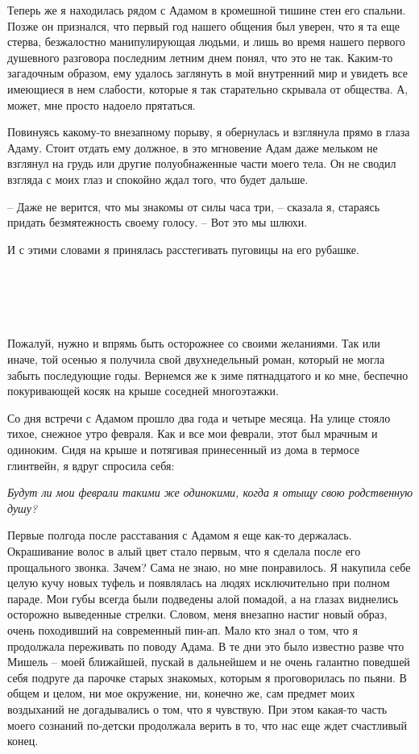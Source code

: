 \documentclass[
]{book}
\begin{document}
Теперь же я находилась рядом с Адамом в кромешной тишине стен его спальни. Позже он признался, что первый год нашего общения был уверен, что я та еще стерва, безжалостно манипулирующая людьми, и лишь во время нашего первого душевного разговора последним летним днем понял, что это не так. Каким-то загадочным образом, ему удалось заглянуть в мой внутренний мир и увидеть все имеющиеся в нем слабости, которые я так старательно скрывала от общества. А, может, мне просто надоело прятаться.

Повинуясь какому-то внезапному порыву, я обернулась и взглянула прямо в глаза Адаму. Стоит отдать ему должное, в это мгновение Адам даже мельком не взглянул на грудь или другие полуобнаженные части моего тела. Он не сводил взгляда с моих глаз и спокойно ждал того, что будет дальше.

-- Даже не верится, что мы знакомы от силы часа три, -- сказала я, стараясь придать безмятежность своему голосу. -- Вот это мы шлюхи.

И с этими словами я принялась расстегивать пуговицы на его рубашке.

\hypertarget{chapter-26}{%
\chapter{~}\label{chapter-26}}

Пожалуй, нужно и впрямь быть осторожнее со своими желаниями. Так или иначе, той осенью я получила свой двухнедельный роман, который не могла забыть последующие годы. Вернемся же к зиме пятнадцатого и ко мне, беспечно покуривающей косяк на крыше соседней многоэтажки.

Со дня встречи с Адамом прошло два года и четыре месяца. На улице стояло тихое, снежное утро февраля. Как и все мои феврали, этот был мрачным и одиноким. Сидя на крыше и потягивая принесенный из дома в термосе глинтвейн, я вдруг спросила себя:

\emph{Будут ли мои феврали такими же одинокими, когда я отыщу свою родственную душу? }

Первые полгода после расставания с Адамом я еще как-то держалась. Окрашивание волос в алый цвет стало первым, что я сделала после его прощального звонка. Зачем? Сама не знаю, но мне понравилось. Я накупила себе целую кучу новых туфель и появлялась на людях исключительно при полном параде. Мои губы всегда были подведены алой помадой, а на глазах виднелись осторожно выведенные стрелки. Словом, меня внезапно настиг новый образ, очень походивший на современный пин-ап. Мало кто знал о том, что я продолжала переживать по поводу Адама. В те дни это было известно разве что Мишель -- моей ближайшей, пускай в дальнейшем и не очень галантно поведшей себя подруге да парочке старых знакомых, которым я проговорилась по пьяни. В общем и целом, ни мое окружение, ни, конечно же, сам предмет моих воздыханий не догадывались о том, что я чувствую. При этом какая-то часть моего сознаний по-детски продолжала верить в то, что нас еще ждет счастливый конец.
\end{document}
